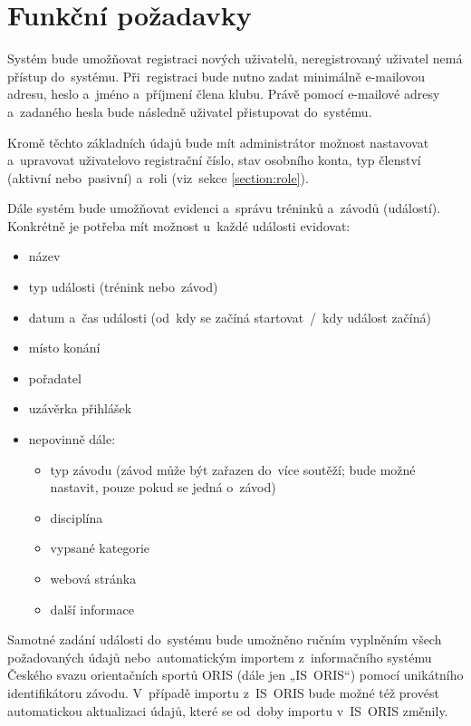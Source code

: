 \section{Funkční požadavky}

\begin{enumerate}[label=\textcolor{decoration}{\textbf{F\arabic*}}]
	Systém bude umožňovat registraci nových uživatelů, neregistrovaný uživatel nemá přístup do~systému. Při~registraci bude nutno zadat minimálně e-mailovou adresu, heslo a~jméno a~příjmení člena klubu. Právě pomocí e-mailové adresy a~zadaného hesla bude následně uživatel přistupovat do~systému.

	Kromě těchto základních údajů bude mít administrátor možnost nastavovat a~upravovat uživatelovo registrační číslo, stav osobního konta, typ členství (aktivní nebo~pasivní) a~roli (viz~sekce \ref{section:role}).

	Dále systém bude umožňovat evidenci a~správu tréninků a~závodů (událostí). Konkrétně je potřeba mít možnost u~každé události evidovat:
	\begin{itemize}
		\item název
		\item typ události (trénink nebo~závod)
		\item datum a~čas události (od~kdy se začíná startovat~/~kdy událost začíná)
		\item místo konání
		\item pořadatel
		\item uzávěrka přihlášek
		\item nepovinně dále:
		\begin{itemize}
			\item typ závodu (závod může být zařazen do~více soutěží; bude možné nastavit, pouze pokud se jedná o~závod)
			\item disciplína
			\item vypsané kategorie
			\item webová stránka
			\item další informace
		\end{itemize}
	\end{itemize}

	Samotné zadání události do~systému bude umožněno ručním vyplněním všech požadovaných údajů nebo~automatickým importem z~informačního systému Českého svazu orientačních sportů ORIS (dále jen „IS~ORIS“) pomocí unikátního identifikátoru závodu. V~případě importu z~IS~ORIS bude možné též provést automatickou aktualizaci údajů, které se od~doby importu v~IS~ORIS změnily.


\end{enumerate}
